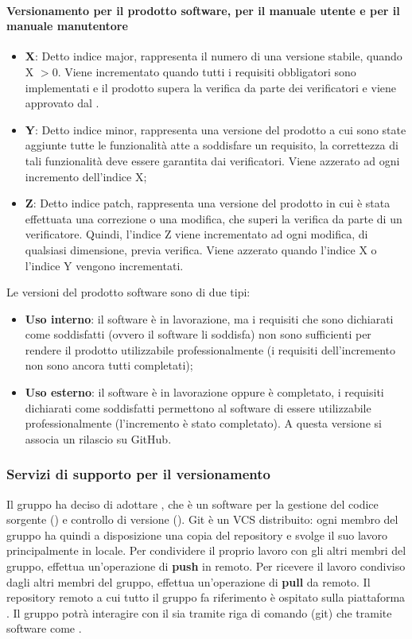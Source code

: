 \paragraph{Versionamento per il prodotto software, per il manuale utente e per il manuale manutentore}
\begin{itemize}
	\item \textbf{X}: Detto indice major, rappresenta il numero di una versione stabile, quando X $> 0$.
	Viene incrementato quando tutti i requisiti obbligatori sono implementati e il prodotto supera la verifica da parte dei verificatori e viene approvato dal \Responsabile{}.
	\item \textbf{Y}: Detto indice minor, rappresenta una versione del prodotto a cui sono state aggiunte tutte le funzionalità atte a soddisfare un requisito, la correttezza di tali funzionalità deve essere garantita dai verificatori.  
	Viene azzerato ad ogni incremento dell'indice X;
	\item \textbf{Z}: Detto indice patch, rappresenta una versione del prodotto in cui è stata effettuata una correzione o una modifica, che superi la verifica da parte di un verificatore.
	Quindi, l'indice Z viene incrementato ad ogni modifica, di qualsiasi dimensione, previa verifica.
	Viene azzerato quando l'indice X o l'indice Y vengono incrementati.
\end{itemize}
Le versioni del prodotto software sono di due tipi:
\begin{itemize}
	\item \textbf{Uso interno}: il software è in lavorazione, ma i requisiti che sono dichiarati come soddisfatti (ovvero il software li soddisfa) non sono sufficienti per rendere il prodotto utilizzabile professionalmente (i requisiti dell'incremento non sono ancora tutti completati);
	\item \textbf{Uso esterno}: il software è in lavorazione oppure è completato, i requisiti dichiarati come soddisfatti permettono al software di essere utilizzabile professionalmente (l'incremento è stato completato). A questa versione si associa un rilascio su GitHub.
\end{itemize}

\subsubsection{Servizi di supporto per il versionamento} 
Il gruppo ha deciso di adottare , che è un software per la gestione del codice sorgente () e controllo di versione ().
Git è un VCS distribuito: ogni membro del gruppo \Gruppo{} ha quindi a disposizione una copia del repository e svolge il suo lavoro principalmente in locale.
Per condividere il proprio lavoro con gli altri membri del gruppo, effettua un'operazione di \textbf{push} in remoto.
Per ricevere il lavoro condiviso dagli altri membri del gruppo, effettua un'operazione di \textbf{pull} da remoto.
Il repository remoto a cui tutto il gruppo fa riferimento è ospitato sulla piattaforma .
Il gruppo \Gruppo{} potrà interagire con il  sia tramite riga di comando (git) che tramite software come .

